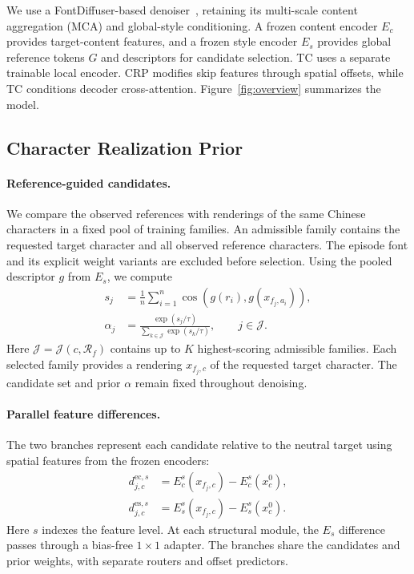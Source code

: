 \documentclass{article}
\begin{document}
We use a FontDiffuser-based denoiser~\citep{yang2024fontdiffuser}, retaining its multi-scale content aggregation (MCA) and global-style conditioning.
A frozen content encoder $E_c$ provides target-content features, and a frozen style encoder $E_s$ provides global reference tokens $G$ and descriptors for candidate selection.
TC uses a separate trainable local encoder.
CRP modifies skip features through spatial offsets, while TC conditions decoder cross-attention.
Figure~\ref{fig:overview} summarizes the model.


\subsection{Character Realization Prior}
\label{sec:crp}

\paragraph{Reference-guided candidates.}
We compare the observed references with renderings of the same Chinese characters in a fixed pool of training families.
An admissible family contains the requested target character and all observed reference characters.
The episode font and its explicit weight variants are excluded before selection.
Using the pooled descriptor $g$ from $E_s$, we compute
\begin{equation}
\begin{aligned}
s_j
&=
\frac{1}{n}
\sum_{i=1}^{n}
\cos\!\left(
    g(r_i),
    g(x_{f_j,a_i})
\right),\\
\alpha_j
&=
\frac{\exp(s_j/\tau)}
     {\sum_{k\in\mathcal J}\exp(s_k/\tau)},
\qquad j\in\mathcal J.
\end{aligned}
\label{eq:prior}
\end{equation}
Here $\mathcal J=\mathcal J(c,\mathcal R_f)$ contains up to $K$ highest-scoring admissible families.
Each selected family provides a rendering $x_{f_j,c}$ of the requested target character.
The candidate set and prior $\alpha$ remain fixed throughout denoising.

\paragraph{Parallel feature differences.}
The two branches represent each candidate relative to the neutral target using spatial features from the frozen encoders:
\begin{equation}
\begin{aligned}
d^{\mathrm{ec},s}_{j,c}
&=
E_c^s(x_{f_j,c})-E_c^s(x_c^0),\\
d^{\mathrm{es},s}_{j,c}
&=
E_s^s(x_{f_j,c})-E_s^s(x_c^0).
\end{aligned}
\label{eq:delta}
\end{equation}
Here $s$ indexes the feature level.
At each structural module, the $E_s$ difference passes through a bias-free $1\times1$ adapter.
The branches share the candidates and prior weights, with separate routers and offset predictors.
\end{document}
